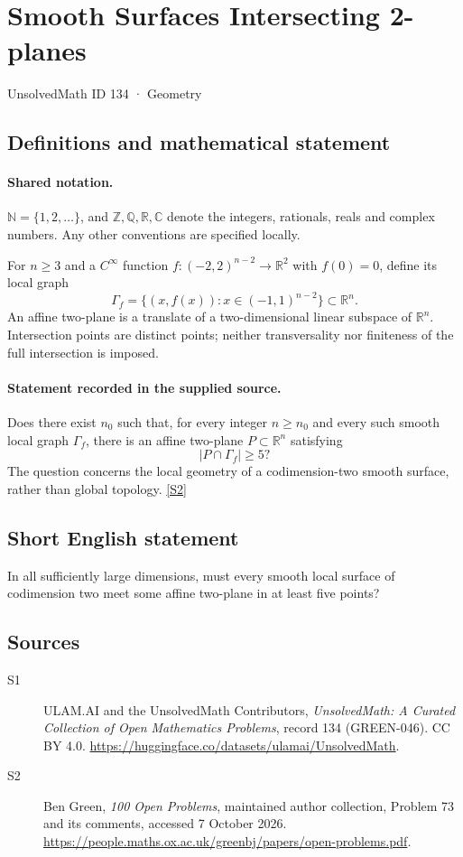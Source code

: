 \documentclass[11pt]{article}
\newcommand{\sref}[2]{\hyperlink{source:#1:#2}{[S#2]}}
\begin{document}
\setcounter{section}{133}
\section{Smooth Surfaces Intersecting 2-planes}\label{134}
{\small\sffamily UnsolvedMath ID 134 · Geometry}
\subsection{Definitions and mathematical statement}

\paragraph{Shared notation.}$\mathbb N=\{1,2,\ldots\}$, and $\mathbb Z,\mathbb Q,\mathbb R,\mathbb C$ denote the integers, rationals, reals and complex numbers. Any other conventions are specified locally.


For $n\geq3$ and a $C^\infty$ function $f:(-2,2)^{n-2}\to\mathbb R^2$ with $f(0)=0$, define its local graph
\[
 \Gamma_f=\{(x,f(x)):x\in(-1,1)^{n-2}\}\subset\mathbb R^n.
\]
An affine two-plane is a translate of a two-dimensional linear subspace of $\mathbb R^n$. Intersection points are distinct points; neither transversality nor finiteness of the full intersection is imposed.
\paragraph{Statement recorded in the supplied source.}
Does there exist $n_0$ such that, for every integer $n\geq n_0$ and every such smooth local graph $\Gamma_f$, there is an affine two-plane $P\subset\mathbb R^n$ satisfying
\[
 |P\cap\Gamma_f|\geq5?
\]
The question concerns the local geometry of a codimension-two smooth surface, rather than global topology. \sref{134}{2}
\subsection{Short English statement}
In all sufficiently large dimensions, must every smooth local surface of codimension two meet some affine two-plane in at least five points?
\subsection{Sources}
\begin{description}
\item[\hypertarget{source:134:1}{S1}] ULAM.AI and the UnsolvedMath Contributors, \emph{UnsolvedMath: A Curated Collection of Open Mathematics Problems}, record 134 (GREEN-046). CC BY 4.0. \url{https://huggingface.co/datasets/ulamai/UnsolvedMath}.
\item[\hypertarget{source:134:2}{S2}] Ben Green, \emph{100 Open Problems}, maintained author collection, Problem 73 and its comments, accessed 7 October 2026. \url{https://people.maths.ox.ac.uk/greenbj/papers/open-problems.pdf}.
\end{description}
\label{end:134}
\end{document}
